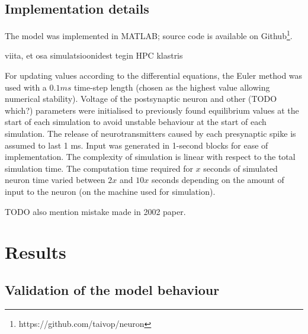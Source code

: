 \documentclass[a4paper,12pt]{report}
\theoremstyle{definition}
\begin{document}
\section{Implementation details}

The model was implemented in MATLAB; source code is available on Github\footnote{https://github.com/taivop/neuron}.

viita, et osa simulatsioonidest tegin HPC klastris

For updating values according to the differential equations, the Euler method was used with a $0.1ms$ time-step length (chosen as the highest value allowing numerical stability). Voltage of the postsynaptic neuron and other (TODO which?) parameters were initialised to previously found equilibrium values at the start of each simulation to avoid unstable behaviour at the start of each simulation. The release of neurotransmitters caused by each presynaptic spike is assumed to last 1 ms. Input was generated in 1-second blocks for ease of implementation. The complexity of simulation is linear with respect to the total simulation time. The computation time required for $x$ seconds of simulated neuron time varied between $2x$ and $10x$ seconds depending on the amount of input to the neuron (on the machine used for simulation).

TODO also mention mistake made in 2002 paper.











\chapter{Results}
\section{Validation of the model behaviour}
\end{document}
